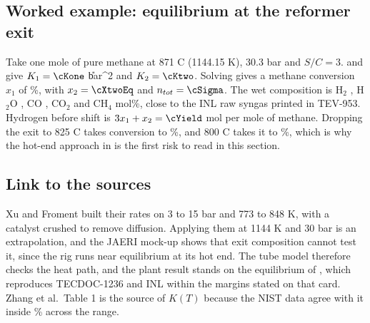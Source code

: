 \subsection*{Worked example: equilibrium at the reformer exit}
Take one mole of pure methane at 871 C (1144.15 K), 30.3 bar and $S/C=3$.  and  give $K_1=\cKone$ \U{bar^2} and $K_2=\cKtwo$. Solving  gives a methane conversion $x_1$ of \cXeq\%, with $x_2=\cXtwoEq$ and $n_{tot}=\cSigma$. The wet composition is H$_2$ \cyH, H$_2$O \cyHO, CO \cyCO, CO$_2$ \cyCOtwo{} and CH$_4$ \cyCH{} mol\%, close to the INL raw syngas printed in TEV-953. Hydrogen before shift is $3x_1+x_2=\cYield$ mol per mole of methane. Dropping the exit to 825 C takes conversion to \cXEighteen\%, and 800 C takes it to \cXEight\%, which is why the hot-end approach in  is the first risk to read in this section.

\subsection*{Link to the sources}
Xu and Froment built their rates on 3 to 15 bar and 773 to 848 K, with a catalyst crushed to remove diffusion. Applying them at 1144 K and 30 bar is an extrapolation, and the JAERI mock-up shows that exit composition cannot test it, since the rig runs near equilibrium at its hot end. The tube model therefore checks the heat path, and the plant result stands on the equilibrium of , which reproduces TECDOC-1236 and INL within the margins stated on that card. Zhang et al.\ Table 1 is the source of $K(T)$ because the NIST data agree with it inside \cKoneDevMax\% across the range.
